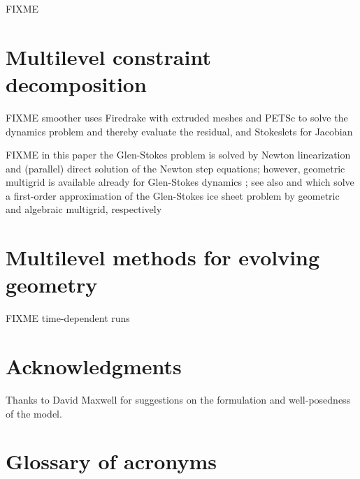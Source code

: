 \documentclass[letterpaper,final,12pt,reqno]{amsart}
\theoremstyle{claim}
\numberwithin{equation}{section}
\numberwithin{figure}{section}
\numberwithin{table}{section}
\numberwithin{theorem}{section}
\begin{document}
FIXME

\section{Multilevel constraint decomposition} \label{sec:mcdstokes}

FIXME smoother uses Firedrake \cite{Alnaesetal2014,Rathgeberetal2016} with extruded meshes \cite{Gibsonetal2019,McRaeetal2016} and PETSc \cite{Balayetal2020,Bueler2021} to solve the dynamics problem and thereby evaluate the residual, and Stokeslets for Jacobian

FIXME in this paper the Glen-Stokes problem is solved by Newton linearization and (parallel) direct solution of the Newton step equations; however, geometric multigrid is available already for Glen-Stokes dynamics \cite{IsaacStadlerGhattas2015}; see also \cite{BrownSmithAhmadia2013} and \cite{Tuminaroetal2016} which solve a first-order approximation of the Glen-Stokes ice sheet problem by geometric and algebraic multigrid, respectively


\section{Multilevel methods for evolving geometry} \label{sec:stokesevolution}

FIXME time-dependent runs


\section*{Acknowledgments}  Thanks to David Maxwell for suggestions on the formulation and well-posedness of the model.

\small

\bigskip



\appendix

\section{Glossary of acronyms} \label{app:glossary}
\end{document}
